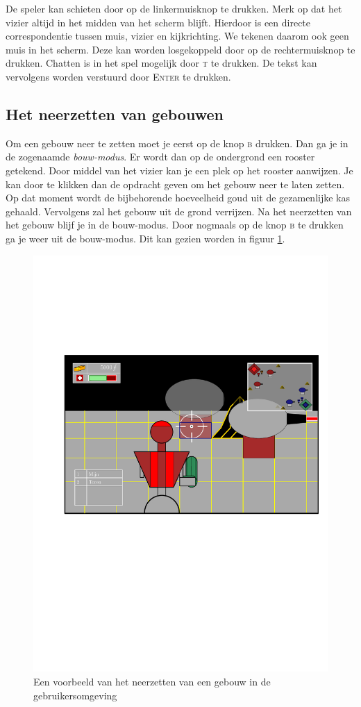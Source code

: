     De speler kan schieten door op de linkermuisknop te drukken. Merk op dat het vizier altijd in het midden van het scherm blijft. Hierdoor is een directe correspondentie tussen muis, vizier en kijkrichting. We tekenen daarom ook geen muis in het scherm. Deze kan worden losgekoppeld door op de rechtermuisknop te drukken. Chatten is in het spel mogelijk door \textsc{t} te drukken. De tekst kan vervolgens worden verstuurd door \textsc{Enter} te drukken.

    \subsection{Het neerzetten van gebouwen}
    Om een gebouw neer te zetten moet je eerst op de knop \textsc{b} drukken. Dan ga je in de zogenaamde \emph{bouw-modus}. Er wordt dan op de ondergrond een rooster getekend. Door middel van het vizier kan je een plek op het rooster aanwijzen. Je kan door te klikken dan de opdracht geven om het gebouw neer te laten zetten. Op dat moment wordt de bijbehorende hoeveelheid goud uit de gezamenlijke kas gehaald. Vervolgens zal het gebouw uit de grond verrijzen. Na het neerzetten van het gebouw blijf je in de bouw-modus. Door nogmaals op de knop \textsc{b} te drukken ga je weer uit de bouw-modus. Dit kan gezien worden in figuur \ref{fig:gebouw}.

    \begin{figure}
    \centering
    \includegraphics[width=\textwidth]{../Graphics/UI2.pdf}
    \caption{Een voorbeeld van het neerzetten van een gebouw in de gebruikersomgeving}
    \label{fig:gebouw}
    \end{figure} 